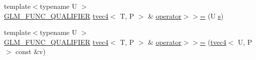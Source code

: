\begin{DoxyCompactItemize}
\item 
{\footnotesize template$<$typename U $>$ }\\\hyperlink{setup_8hpp_a33fdea6f91c5f834105f7415e2a64407}{G\+L\+M\+\_\+\+F\+U\+N\+C\+\_\+\+Q\+U\+A\+L\+I\+F\+I\+ER} \hyperlink{structglm_1_1detail_1_1tvec4}{tvec4}$<$ T, P $>$ \& \hyperlink{structglm_1_1detail_1_1tvec4_a7fe7eefe66d5c896d21c32a4ec597cae}{operator$>$$>$=} (U \hyperlink{structglm_1_1detail_1_1tvec4_a82cbced4cbd070056c5acbc1d4d4906f}{s})
\item 
{\footnotesize template$<$typename U $>$ }\\\hyperlink{setup_8hpp_a33fdea6f91c5f834105f7415e2a64407}{G\+L\+M\+\_\+\+F\+U\+N\+C\+\_\+\+Q\+U\+A\+L\+I\+F\+I\+ER} \hyperlink{structglm_1_1detail_1_1tvec4}{tvec4}$<$ T, P $>$ \& \hyperlink{structglm_1_1detail_1_1tvec4_a080d672296e86beecd2d91b75bc0e843}{operator$>$$>$=} (\hyperlink{structglm_1_1detail_1_1tvec4}{tvec4}$<$ U, P $>$ const \&v)
\end{DoxyCompactItemize}
